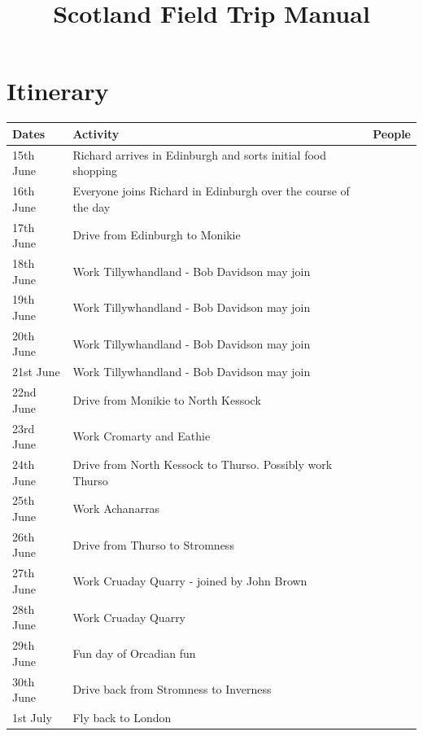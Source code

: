 \documentclass[12pt,letterpaper]{article}
\begin{document}
\title{Scotland Field Trip Manual}
\maketitle

\pagebreak

\tableofcontents


\pagebreak


\section{Itinerary}

\begin{table}[!htpb]
\centering
\begin{tabular}{l l l}
	\textbf{Dates} & \textbf{Activity} & \textbf{People} \\
	\hline
	15th June & Richard arrives in Edinburgh and sorts initial food shopping\\
	16th June & Everyone joins Richard in Edinburgh over the course of the day\\
	17th June & Drive from Edinburgh to Monikie\\
	18th June & Work Tillywhandland - Bob Davidson may join\\
	19th June & Work Tillywhandland - Bob Davidson may join\\
	20th June & Work Tillywhandland - Bob Davidson may join\\
	21st June & Work Tillywhandland - Bob Davidson may join\\
	22nd June & Drive from Monikie to North Kessock \\
	23rd June & Work Cromarty and Eathie \\
	24th June & Drive from North Kessock to Thurso.  Possibly work Thurso \\
	25th June & Work Achanarras \\
	26th June & Drive from Thurso to Stromness \\
	27th June & Work Cruaday Quarry - joined by John Brown \\
	28th June & Work Cruaday Quarry \\
	29th June & Fun day of Orcadian fun \\
	30th June & Drive back from Stromness to Inverness \\
	1st July & Fly back to London \\

\end{tabular} \\
\end{table}
\end{document}
